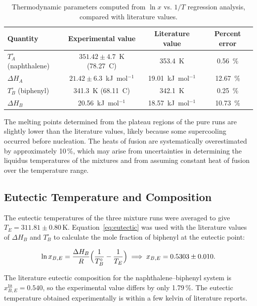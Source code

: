 \documentclass[12pt]{article}
\begin{document}
\begin{table}[h]
\centering
\begin{tabular}{@{}lccc@{}}
\toprule
Quantity & Experimental value & Literature value \cite{gallus2001binary} & Percent error \\ \midrule
$T_A^{\circ}$ (naphthalene) & $351.42\pm4.7$~K (78.27~\textdegree{}C) & 353.4~K & 0.56~\% \\ 
$\Delta H_A$ & $21.42\pm6.3$~kJ~mol$^{-1}$ & 19.01~kJ~mol$^{-1}$ & 12.67~\% \\ 
$T_B^{\circ}$ (biphenyl) & 341.3~K (68.11~\textdegree{}C) & 342.1~K & 0.25~\% \\ 
$\Delta H_B$ & 20.56~kJ~mol$^{-1}$ & 18.57~kJ~mol$^{-1}$ & 10.73~\% \\ \bottomrule
\end{tabular}
\caption{Thermodynamic parameters computed from $\ln x$ vs. $1/T$ regression analysis, compared with literature values.}
\label{tab:thermo}
\end{table}

The melting points determined from the plateau regions of the pure runs are slightly lower than the literature values, likely because some supercooling occurred before nucleation.  The heats of fusion are systematically overestimated by approximately 10\,\%, which may arise from uncertainties in determining the liquidus temperatures of the mixtures and from assuming constant heat of fusion over the temperature range.
\subsection*{Eutectic Temperature and Composition}

The eutectic temperatures of the three mixture runs were averaged to give $T_E = 311.81 \pm0.80\,\text{K}$.  Equation~\ref{eq:eutectic} was used with the literature values of $\Delta H_B$ and $T_B^{\circ}$ to calculate the mole fraction of biphenyl at the eutectic point:

\begin{equation}
\ln x_{B,E} = \frac{\Delta H_B}{R}\Bigl(\frac{1}{T_B^{\circ}} - \frac{1}{T_E}\Bigr) \; \Longrightarrow \; x_{B,E} = 0.5303\pm0.010.
\end{equation}

The literature eutectic composition for the naphthalene–biphenyl system is $x_{B,E}^{\mathrm{lit}} = 0.540$, so the experimental value differs by only 1.79\,\%.  The eutectic temperature obtained experimentally is within a few kelvin of literature reports.
\end{document}
